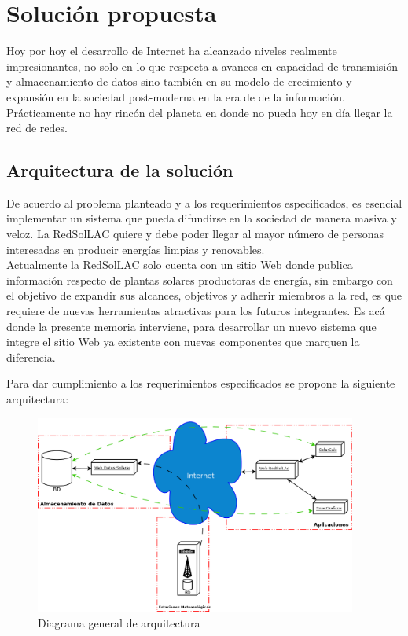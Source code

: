 \chapter{Solución propuesta}
\label{solucion}
Hoy por hoy el desarrollo de Internet ha alcanzado niveles realmente impresionantes, no solo en lo que respecta a avances en capacidad de transmisión y almacenamiento de datos sino también en su modelo de crecimiento y expansión en la sociedad post-moderna en la era de de la información. Prácticamente no hay rincón del planeta en donde no pueda hoy en día llegar la red de redes.\\

\section{Arquitectura de la solución}
\label{arquitectura}
De acuerdo al problema planteado y a los requerimientos especificados, es esencial implementar un sistema que pueda difundirse en la sociedad de manera masiva y veloz. La RedSolLAC quiere y debe poder llegar al mayor número de personas interesadas en producir energías limpias y renovables.\\

Actualmente la RedSolLAC solo cuenta con un sitio Web donde publica información respecto de plantas solares productoras de energía, sin embargo con el objetivo de expandir sus alcances, objetivos y adherir miembros a la red, es que requiere de nuevas herramientas atractivas para los futuros integrantes. Es acá donde la presente memoria interviene, para desarrollar un nuevo sistema que integre el sitio Web ya existente con nuevas componentes que marquen la diferencia.

Para dar cumplimiento a los requerimientos especificados se propone la siguiente arquitectura:

\begin{figure}[h!]
        \centering
        \includegraphics[width=300pt]{images/diagramaArquitectura}
        \caption{Diagrama general de arquitectura}
	\label{da}
\end{figure}

